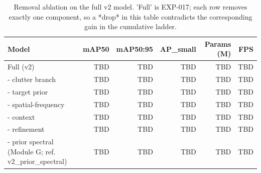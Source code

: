 \begin{table}[t]
\centering
\caption{Removal ablation on the full v2 model. 'Full' is EXP-017; each row removes exactly one component, so a *drop* in this table contradicts the corresponding gain in the cumulative ladder.}
\label{tab:removal_ablation}
\begin{tabular}{lrrrrr}
\toprule
Model & mAP50 & mAP50:95 & AP_small & Params (M) & FPS \\
\midrule
Full (v2) & TBD & TBD & TBD & TBD & TBD \\
- clutter branch & TBD & TBD & TBD & TBD & TBD \\
- target prior & TBD & TBD & TBD & TBD & TBD \\
- spatial-frequency & TBD & TBD & TBD & TBD & TBD \\
- context & TBD & TBD & TBD & TBD & TBD \\
- refinement & TBD & TBD & TBD & TBD & TBD \\
- prior spectral (Module G; ref. v2_prior_spectral) & TBD & TBD & TBD & TBD & TBD \\
\bottomrule
\end{tabular}
\end{table}
